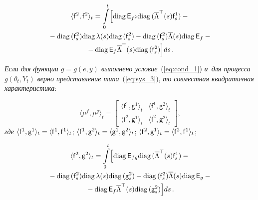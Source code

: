 \begin{multicols}{2}
\vspace*{-12pt}

\noindent
\begin{multline}
\langle \mathsf{f}^2, \mathsf{f}^2 \rangle_t= \int\limits_0^t\Bigl[
\mathrm{diag}\,{\mathsf E}_{f^2}\mathrm{diag}\,( \overline{\Lambda}^{\top}(s)\mathsf{f}^1_s) -{}\\
{}- \mathrm{diag}\,(\mathsf{f}^2_s) 
\mathrm{diag}\,\lambda(s)  \mathrm{diag}\, (\mathsf{f}^2_s)
-  \mathrm{diag}\,(\mathsf{f}^2_s) \overline{\Lambda}(s)\mathrm{diag}\,{\mathsf E}_f - {}\\
{}-\mathrm{diag}\,{\mathsf E}_f 
\overline{\Lambda}^{\top}(s) \mathrm{diag}\, (\mathsf{f}^2_s)
\Bigl] ds\,.
\label{eq:sc_22}
\end{multline}

\vspace*{-3pt}

\noindent
\textit{Если для функции $g=g(e,y)$ выполнено условие}~(\ref{eq:cond_1}) \textit{и~для процесса 
$g(\theta_t,Y_t)$ верно представление типа}~(\ref{eq:sys_3}), \textit{то совместная квадратичная характеристика}: 

\pagebreak

\noindent
$$
\langle  \mu^f,\mu^g\rangle_t= \left[
\begin{array}{cc}
\langle \mathsf{f}^1, \mathsf{g}^1 \rangle_t & \langle \mathsf{f}^1, 
\mathsf{g}^2 \rangle_t \\
\langle \mathsf{f}^2, \mathsf{g}^1 \rangle_t & \langle \mathsf{f}^2, 
\mathsf{g}^2 \rangle_t
\end{array}
\right],
$$ 
\textit{где}
$\langle \mathsf{f}^1, \mathsf{g}^1 \rangle_t\hm = \langle \mathsf{f}^1, \mathsf{f}^1 \rangle_t$;
$\langle \mathsf{f}^1, \mathsf{g}^2 \rangle_t\hm = \langle \mathsf{g}^1, 
\mathsf{g}^2 \rangle_t$;
$\langle \mathsf{f}^2, \mathsf{g}^1 \rangle_t \hm= \langle \mathsf{f}^2, \mathsf{f}^1 \rangle_t$;

\vspace*{-6pt}

\noindent
\begin{multline}
\langle \mathsf{f}^2, \mathsf{g}^2 \rangle_t=
\int\limits_0^t\Bigl[
\mathrm{diag}\,{\mathsf E}_{fg}\mathrm{diag}\, ( \overline{\Lambda}^{\top}(s)\mathsf{f}^1_s) - {}\\
{}- \mathrm{diag}\,(\mathsf{f}^2_s) 
\mathrm{diag}\,\lambda(s)  \mathrm{diag}\, (\mathsf{g}^2_s)
-  \mathrm{diag}\,(\mathsf{f}^2_s) \overline{\Lambda}(s)\mathrm{diag}\,{\mathsf E}_g - {}\\
{}-\mathrm{diag}\,{\mathsf E}_f 
\overline{\Lambda}^{\top}(s) \mathrm{diag}\,(\mathsf{g}^2_s)
\Bigl]ds\,.
\label{eq:sc_fg}
\end{multline}


\end{multicols}
